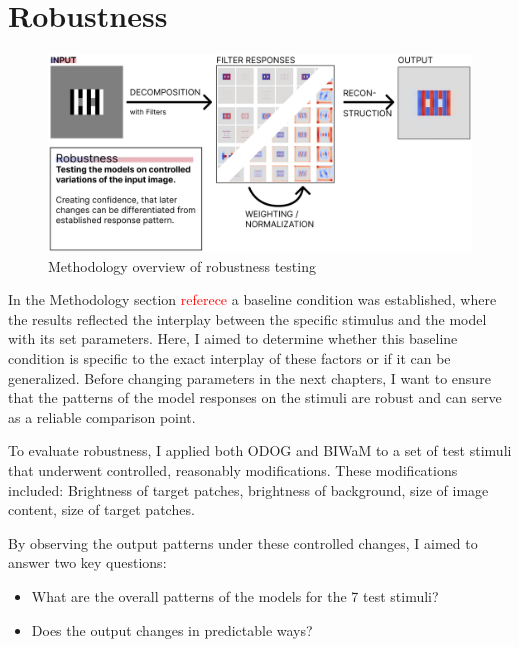 \newpage
\section{Robustness}

\begin{figure}[H]
    \centering
    \includegraphics[width=\linewidth]{media/methodology/robustness_overview.png}
    \begin{minipage}{0.8\textwidth}
    \caption{Methodology overview of robustness testing}
    \label{fig:figure10}
    \end{minipage}
\end{figure}
In the Methodology section \textcolor{red}{referece} a baseline condition was established,
where the results reflected the interplay between the specific stimulus and the model with
its set parameters. Here, I aimed to determine whether this baseline condition is specific
to the exact interplay of these factors or if it can be generalized. Before changing
parameters in the next chapters, I want to ensure that the patterns of the model responses
on the stimuli are robust and can serve as a reliable comparison point.

To evaluate robustness, I applied both ODOG and BIWaM to a set of test stimuli that
underwent controlled, reasonably modifications. These modifications included: Brightness of
target patches, brightness of background, size of image content, size of target patches.

By observing the output patterns under these controlled changes, I aimed to answer two key
questions: 
\begin{itemize}
    \item What are the overall patterns of the models for the 7 test stimuli?
    \item Does the output changes in predictable ways?
\end{itemize}

